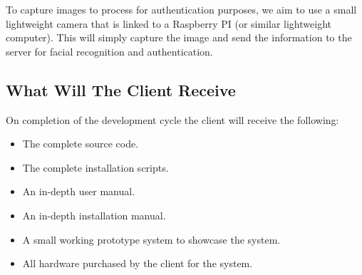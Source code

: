 To capture images to process for authentication purposes, we aim to use a small lightweight camera that is linked to a Raspberry PI (or similar lightweight computer). This will simply capture the image and send the information to the server for facial recognition and authentication.

\subsection{What Will The Client Receive}
On completion of the development cycle the client will receive the following:
\begin{itemize}
	\item The complete source code.
	\item The complete installation scripts.
	\item An in-depth user manual.
	\item An in-depth installation manual.
	\item A small working prototype system to showcase the system.
	\item All hardware purchased by the client for the system.
\end{itemize}